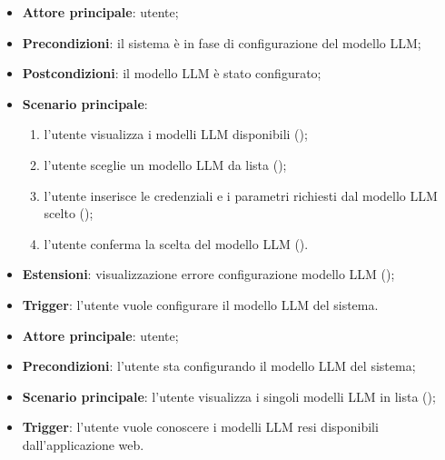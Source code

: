 \documentclass[10pt, a4paper]{article}
\begin{document}
    \begin{itemize}
        \item \textbf{Attore principale}: utente;
        \item \textbf{Precondizioni}: il sistema è in fase di configurazione del modello LLM;
        \item \textbf{Postcondizioni}: il modello LLM è stato configurato;
        \item \textbf{Scenario principale}:
            \begin{enumerate}
                \item l’utente visualizza i modelli LLM disponibili ();
                \item l’utente sceglie un modello LLM da lista ();
                \item l’utente inserisce le credenziali e i parametri richiesti dal modello LLM scelto ();
                \item l’utente conferma la scelta del modello LLM ().
            \end{enumerate}
        \item \textbf{Estensioni}: visualizzazione errore configurazione modello LLM ();
        \item \textbf{Trigger}: l’utente vuole configurare il modello LLM del sistema.
    \end{itemize}
    

    \begin{itemize}
        \item \textbf{Attore principale}: utente;
        \item \textbf{Precondizioni}: l’utente sta configurando il modello LLM del sistema;
        \item \textbf{Scenario principale}: l’utente visualizza i singoli modelli LLM in lista ();
        \item \textbf{Trigger}: l’utente vuole conoscere i modelli LLM resi disponibili dall’applicazione web.
    \end{itemize}
\end{document}
